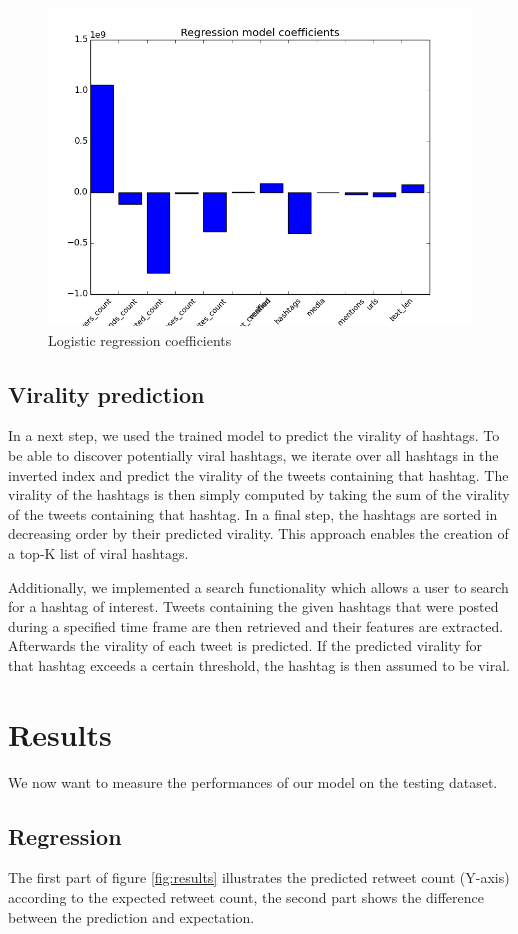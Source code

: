 \begin{figure}[H]
\centering
\includegraphics[width=0.6\linewidth]{img/coefficientsLR1.png}
\caption{Logistic regression coefficients}
\label{fig:coefficientsLR}
\end{figure}


\subsection{Virality prediction}
In a next step, we used the trained model to predict the virality of hashtags. To be able to discover potentially viral hashtags, we iterate over all hashtags in the inverted index and predict the virality of the tweets containing that hashtag. The virality of the hashtags is then simply computed by taking the sum of the virality of the tweets containing that hashtag. In a final step, the hashtags are sorted in decreasing order by their predicted virality. This approach enables the creation of a top-K list of viral hashtags. 

Additionally, we implemented a search functionality which allows a user to search for a hashtag of interest. Tweets containing the given hashtags that were posted during a specified time frame are then retrieved and their features are extracted. Afterwards the virality of each tweet is predicted. If the predicted virality for that hashtag exceeds a certain threshold, the hashtag is then assumed to be viral. 

\section{Results}
We now want to measure the performances of our model on the testing dataset.

\subsection{Regression}
The first part of figure \ref{fig:results} illustrates the predicted retweet count (Y-axis) according to the expected retweet count, the second part shows the difference between the prediction and expectation. 


